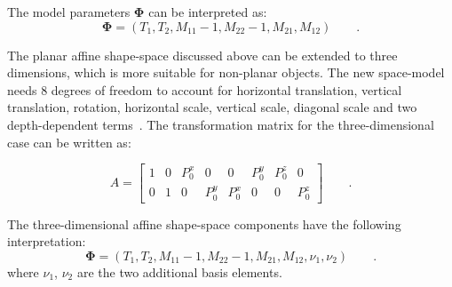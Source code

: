 The model parameters $\mathbf{\Phi}$ can be interpreted as:
\begin{equation}
  \label{eq:4.19}
  \mathbf{\Phi} =  (T_1, T_2, M_{11} - 1, M_{22} - 1, M_{21}, M_{12})\qquad.
\end{equation}

The planar affine shape-space discussed above can be extended to
three dimensions, which is more suitable for
non-planar objects. The new space-model needs 8 degrees of freedom to
account for horizontal
translation, vertical translation, rotation, horizontal scale,
vertical scale, diagonal scale and two depth-dependent terms~\cite{blake1998active}. The transformation matrix for the three-dimensional case
can be written as:

\begin{equation}
  \label{eq:4.20}
  A =
  \begin{bmatrix}
    1 & 0 & P_0^x & 0 & 0 & P_0^y & P_0^z & 0\\
    0 & 1 & 0 & P_0^y & P_0^x & 0 & 0 & P_0^z
  \end{bmatrix} \qquad.
\end{equation}

The three-dimensional affine shape-space components have
the following interpretation:
\begin{equation}
  \label{eq:4.19}
  \mathbf{\Phi} =  (T_1, T_2, M_{11} - 1, M_{22} - 1, M_{21}, M_{12},
  \nu_1, \nu_2) \qquad.
\end{equation}
where $\nu_1$, $\nu_2$ are the two additional basis elements.


